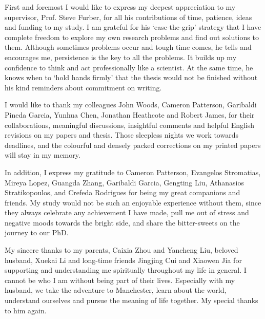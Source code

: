First and foremost I would like to express my deepest appreciation to my supervisor, Prof. Steve Furber, for all his contributions of time, patience, ideas and funding to my study.
I am grateful for his `ease-the-grip' strategy that I have complete freedom to explore my own research problems and find out solutions to them.
Although sometimes problems occur and tough time comes, he tells and encourages me, persistence is the key to all the problems.
It builds up my confidence to think and act professionally like a scientist.
At the same time, he knows when to `hold hands firmly' that the thesis would not be finished without his kind reminders about commitment on writing.

I would like to thank my colleagues John Woods, Cameron Patterson, Garibaldi Pineda Garcia, Yunhua Chen, Jonathan Heathcote and Robert James, for their collaborations, meaningful discussions, insightful comments and helpful English revisions on my papers and thesis.
Those sleepless nights we work towards deadlines, and the colourful and densely packed corrections on my printed papers will stay in my memory.

In addition, I express my gratitude to Cameron Patterson, Evangelos Stromatias, Mireya Lopez, Guangda Zhang, Garibaldi Garcia, Gengting Liu, Athanasios Stratikopoulos, and Crefeda Rodrigues for being my great companions and friends.
My study would not be such an enjoyable experience without them, since they always celebrate any achievement I have made, pull me out of stress and negative moods towards the bright side, and share the bitter-sweets on the journey to our PhD.

My sincere thanks to my parents, Caixia Zhou and Yancheng Liu, beloved husband, Xuekai Li and long-time friends Jingjing Cui and Xiaowen Jia for supporting and understanding me spiritually throughout my life in general.
I cannot be who I am without being part of their lives.
Especially with my husband, we take the adventure to Manchester, learn about the world, understand ourselves and pursue the meaning of life together.
My special thanks to him again. 
 
 	
